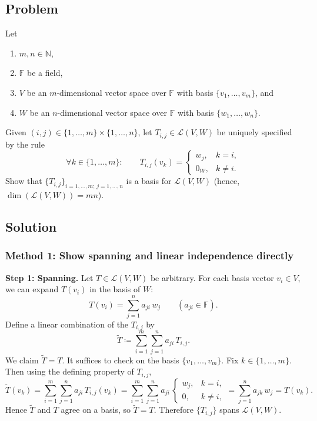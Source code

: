 \documentclass[12pt]{article}
\newcommand{\F}{\mathbb{F}}
\newcommand{\cL}{\mathcal{L}}
\begin{document}
\subsection{Problem}
Let
\begin{enumerate}[label=(\roman*)]
\item $m,n\in\mathbb{N}$,
\item $\F$ be a field,
\item $V$ be an $m$-dimensional vector space over $\F$ with basis $\{v_1,\dots,v_m\}$, and
\item $W$ be an $n$-dimensional vector space over $\F$ with basis $\{w_1,\dots,w_n\}$.
\end{enumerate}
Given $(i,j)\in\{1,\dots,m\}\times\{1,\dots,n\}$, let $T_{i,j}\in \cL(V,W)$ be uniquely specified by the rule
\[
\forall k\in\{1,\dots,m\}:\qquad
T_{i,j}(v_k)=
\begin{cases}
w_j, & k=i,\\
0_W, & k\neq i.
\end{cases}
\]
Show that $\{T_{i,j}\}_{i=1,\dots,m;\,j=1,\dots,n}$ is a basis for $\cL(V,W)$ (hence, $\dim(\cL(V,W))=mn$).

\subsection{Solution}

\subsubsection{Method 1: Show spanning and linear independence directly}

\noindent\textbf{Step 1: Spanning.}
Let $T\in\cL(V,W)$ be arbitrary. For each basis vector $v_i\in V$, we can expand $T(v_i)$ in the basis of $W$:
\[
T(v_i)=\sum_{j=1}^n a_{j i}\, w_j \qquad (a_{j i}\in\F).
\]
Define a linear combination of the $T_{i,j}$ by
\[
\widetilde{T}\coloneqq \sum_{i=1}^m\sum_{j=1}^n a_{j i}\, T_{i,j}.
\]
We claim $\widetilde{T}=T$. It suffices to check on the basis $\{v_1,\dots,v_m\}$.
Fix $k\in\{1,\dots,m\}$. Then using the defining property of $T_{i,j}$,
\[
\widetilde{T}(v_k)
=
\sum_{i=1}^m\sum_{j=1}^n a_{j i}\, T_{i,j}(v_k)
=
\sum_{i=1}^m\sum_{j=1}^n a_{j i}\,
\begin{cases}
w_j,& k=i,\\
0,& k\neq i,
\end{cases}
=
\sum_{j=1}^n a_{j k}\, w_j
=
T(v_k).
\]
Hence $\widetilde{T}$ and $T$ agree on a basis, so $\widetilde{T}=T$. Therefore $\{T_{i,j}\}$ spans $\cL(V,W)$.
\end{document}
